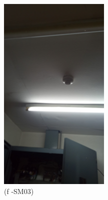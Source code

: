 \begin{figure}
\begin{minipage}[b]{0.2\linewidth}
		\includegraphics[width=\textwidth]{figures/fig_ch04_fdas_sm03}
	\caption*{(f -SM03)}
\end{minipage}
	\hspace{0.05cm}
\begin{minipage}[b]{0.2\linewidth}
	\centering

\end{minipage}
\end{figure}
